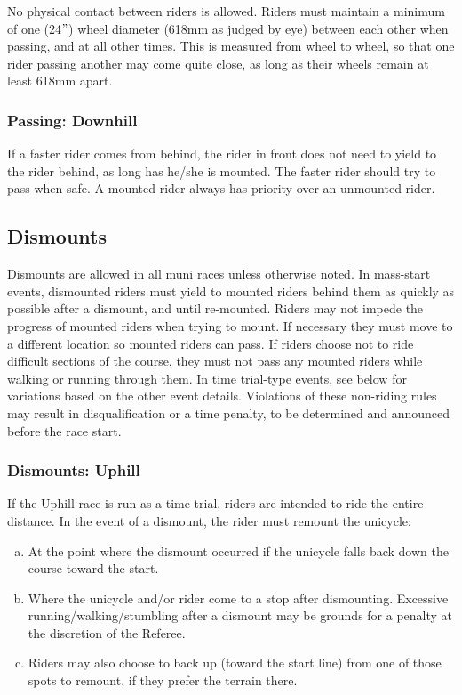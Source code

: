 No physical contact between riders is allowed.
Riders must maintain a minimum of one (24$"$) wheel diameter (618mm as judged by eye) between each other when passing, and at all other times.
This is measured from wheel to wheel, so that one rider passing another may come quite close, as long as their wheels remain at least 618mm apart.

\subsubsection{Passing: Downhill}

If a faster rider comes from behind, the rider in front does not need to yield to the rider behind, as long has he/she is mounted.
The faster rider should try to pass when safe.
A mounted rider always has priority over an unmounted rider.

\subsection{Dismounts}
Dismounts are allowed in all muni races unless otherwise noted.
In mass-start events, dismounted riders must yield to mounted riders behind them as quickly as possible after a dismount, and until re-mounted.
Riders may not impede the progress of mounted riders when trying to mount.
If necessary they must move to a different location so mounted riders can pass.
If riders choose not to ride difficult sections of the course, they must not pass any mounted riders while walking or running through them.
In time trial-type events, see below for variations based on the other event details.
Violations of these non-riding rules may result in disqualification or a time penalty, to be determined and announced before the race start.

\subsubsection{Dismounts: Uphill}
If the Uphill race is run as a time trial, riders are intended to ride the entire distance.
In the event of a dismount, the rider must remount the unicycle:
\begin{enumerate}[(a)]
\item At the point where the dismount occurred if the unicycle falls back down the course toward the start.
\item Where the unicycle and/or rider come to a stop after dismounting.
Excessive running/walking/stumbling after a dismount may be grounds for a
penalty at the discretion of the Referee.
\item Riders may also choose to back up (toward the start line) from one of those spots to remount, if they prefer the terrain there.
\end{enumerate}

